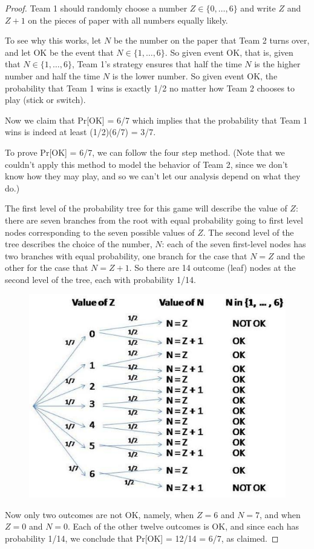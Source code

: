 \documentclass[14pt]{extarticle}
\begin{document}
\begin{proof}
Team 1 should randomly choose a number $Z \in \{0, \ldots, 6\}$ and write $Z$ and $Z + 1$ on the pieces of paper with all numbers equally likely.

To see why this works, let $N$ be the number on the paper that Team 2 turns over, and let OK be the event that $N \in \{1, \ldots, 6\}$. So given event OK, that is, given that $N \in \{1, \ldots, 6\}$, Team 1’s strategy ensures that half the time $N$ is the higher number and half the time $N$ is the lower number. So given event OK, the probability that Team 1 wins is exactly 1/2 no matter how Team 2 chooses to play (stick or switch).

Now we claim that Pr[OK] = 6/7 which implies that the probability that Team 1 wins is indeed at least (1/2)(6/7) = 3/7.

To prove Pr[OK] = 6/7, we can follow the four step method. (Note that we couldn’t apply this method to model the behavior of Team 2, since we don’t know how they may play, and so we can’t let our analysis depend on what they do.)

The first level of the probability tree for this game will describe the value of $Z$: there are seven branches from the root with equal probability going to first level nodes corresponding to the seven
possible values of $Z$. The second level of the tree describes the choice of the number, $N$: each of the seven first-level nodes has two branches with equal probability, one branch for the case that
$N = Z$ and the other for the case that $N = Z + 1$. So there are 14 outcome (leaf) nodes at the second level of the tree, each with probability 1/14.

\begin{figure}[ht!]
\centering
\includegraphics[scale=0.6]{guess-game.png}
\end{figure}

Now only two outcomes are not OK, namely, when $Z = 6$ and $N = 7$, and when $Z = 0$ and $N = 0$. Each of the other twelve outcomes is OK, and since each has probability 1/14, we conclude that Pr[OK] = 12/14 = 6/7, as claimed.
\end{proof}
\end{document}
